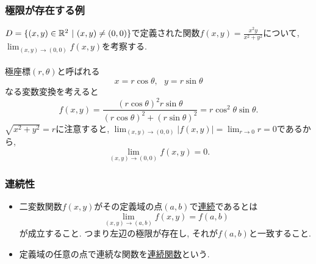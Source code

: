 

\begin{frame}
\frametitle{極限が存在する例}

$D=\{(x,y) \in \mathbb{R}^2 \ | \ (x,y) \ne (0,0)\}$で定義された関数$f(x,y)=\frac{x^2y}{x^2+y^2}$について, $\displaystyle \lim_{(x,y)\to (0,0)}f(x,y)$を考察する. \\
\ \\

極座標$(r,\theta)$と呼ばれる
$$
x= r \cos \theta, \ \ \ y = r \sin \theta
$$
なる変数変換を考えると
$$
f(x,y)=\frac{(r\cos \theta)^2 r \sin \theta}{(r \cos \theta)^2+(r \sin \theta)^2}=r \cos^2 \theta \sin \theta. 
$$
$\sqrt{x^2+y^2}=r$に注意すると, $\displaystyle \lim_{(x,y)\to (0,0)}|f(x,y)|= \lim_{r \to 0} r=0$であるから, 
$$
\lim_{(x,y)\to (0,0)}f(x,y)=0.
$$
 
\end{frame}




\begin{frame}
\frametitle{連続性}


\begin{Def}
\begin{itemize}
\item 二変数関数$f(x,y)$がその定義域の点$(a,b)$で\underline{連続}であるとは
$$
\lim_{(x,y)\to (a,b)}f(x,y) = f(a,b)
$$
が成立すること. つまり左辺の極限が存在し, それが$f(a,b)$と一致すること. 
\item 定義域の任意の点で連続な関数を\underline{連続関数}という. 
\end{itemize}
\end{Def}

\end{frame}









